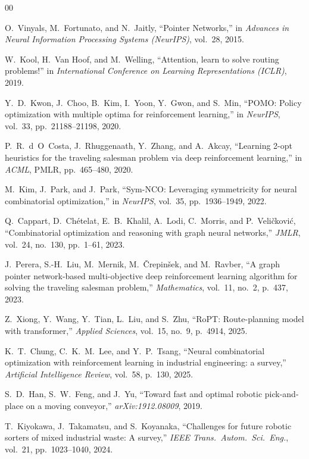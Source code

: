 \documentclass[conference]{IEEEtran}
\begin{document}
\begin{thebibliography}{00}

 O.~Vinyals, M.~Fortunato, and N.~Jaitly, ``Pointer Networks,'' in \emph{Advances in Neural Information Processing Systems (NeurIPS)}, vol.~28, 2015.

 W.~Kool, H.~Van Hoof, and M.~Welling, ``Attention, learn to solve routing problems!'' in \emph{International Conference on Learning Representations (ICLR)}, 2019.

 Y.~D.~Kwon, J.~Choo, B.~Kim, I.~Yoon, Y.~Gwon, and S.~Min, ``POMO: Policy optimization with multiple optima for reinforcement learning,'' in \emph{NeurIPS}, vol.~33, pp.~21188--21198, 2020.

 P.~R.~d~O~Costa, J.~Rhuggenaath, Y.~Zhang, and A.~Akcay, ``Learning 2-opt heuristics for the traveling salesman problem via deep reinforcement learning,'' in \emph{ACML}, PMLR, pp.~465--480, 2020.

 M.~Kim, J.~Park, and J.~Park, ``Sym-NCO: Leveraging symmetricity for neural combinatorial optimization,'' in \emph{NeurIPS}, vol.~35, pp.~1936--1949, 2022.

 Q.~Cappart, D.~Ch\'{e}telat, E.~B.~Khalil, A.~Lodi, C.~Morris, and P.~Veli\v{c}kovi\'{c}, ``Combinatorial optimization and reasoning with graph neural networks,'' \emph{JMLR}, vol.~24, no.~130, pp.~1--61, 2023.

 J.~Perera, S.-H.~Liu, M.~Mernik, M.~\v{C}repin\v{s}ek, and M.~Ravber, ``A graph pointer network-based multi-objective deep reinforcement learning algorithm for solving the traveling salesman problem,'' \emph{Mathematics}, vol.~11, no.~2, p.~437, 2023.

 Z.~Xiong, Y.~Wang, Y.~Tian, L.~Liu, and S.~Zhu, ``RoPT: Route-planning model with transformer,'' \emph{Applied Sciences}, vol.~15, no.~9, p.~4914, 2025.

 K.~T.~Chung, C.~K.~M.~Lee, and Y.~P.~Tsang, ``Neural combinatorial optimization with reinforcement learning in industrial engineering: a survey,'' \emph{Artificial Intelligence Review}, vol.~58, p.~130, 2025.

 S.~D.~Han, S.~W.~Feng, and J.~Yu, ``Toward fast and optimal robotic pick-and-place on a moving conveyor,'' \emph{arXiv:1912.08009}, 2019.

 T.~Kiyokawa, J.~Takamatsu, and S.~Koyanaka, ``Challenges for future robotic sorters of mixed industrial waste: A survey,'' \emph{IEEE Trans.\ Autom.\ Sci.\ Eng.}, vol.~21, pp.~1023--1040, 2024.


\end{thebibliography}
\end{document}
